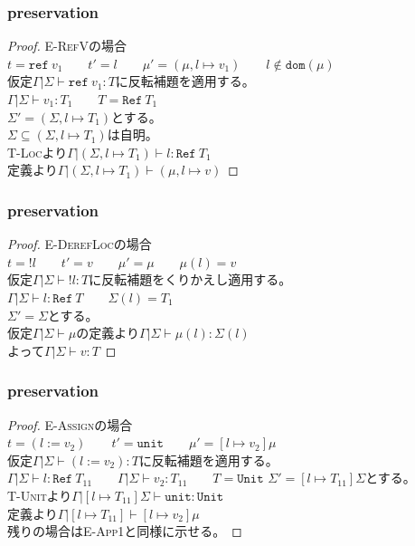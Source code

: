 \documentclass[dvipdfmx,cjk,xcolor=dvipsnames,envcountsect,notheorems]{beamer}
\theoremstyle{definition}
\newcommand{\REF}{\texttt{ref}}
\newcommand{\REFT}{\texttt{Ref}}
\newcommand{\UNIT}{\texttt{unit}}
\newcommand{\UNITT}{\texttt{Unit}}
\begin{document}
\begin{frame}
	\frametitle{preservation}
	\Large
	\begin{proof}
		\textsc{E-RefV}の場合\\
		$t = \REF~v_1 \qquad t' = l \qquad \mu' = (\mu, l \mapsto v_1) \qquad l \notin \texttt{dom}(\mu)$\\
		仮定$\Gamma | \Sigma \vdash \REF~v_1 : T$に反転補題を適用する。\\
		$\Gamma | \Sigma \vdash v_1 : T_1 \qquad T=\REFT~T_1$\\
		$\Sigma' = (\Sigma, l \mapsto T_1)$とする。\\
		$\Sigma \subseteq (\Sigma, l \mapsto T_1)$は自明。\\
		\textsc{T-Loc}より$\Gamma | (\Sigma, l \mapsto T_1) \vdash l : \REFT~T_1$\\
		定義より$\Gamma | (\Sigma, l \mapsto T_1) \vdash (\mu, l \mapsto v)$
	\end{proof}
\end{frame}

\begin{frame}
	\frametitle{preservation}
	\Large
	\begin{proof}
		\textsc{E-DerefLoc}の場合\\
		$t = !l \qquad t' = v \qquad \mu' = \mu \qquad \mu(l)=v$\\
		仮定$\Gamma | \Sigma \vdash !l : T$に反転補題をくりかえし適用する。\\
		$\Gamma | \Sigma \vdash l : \REFT~T \qquad \Sigma(l) = T_1$\\
		$\Sigma'=\Sigma$とする。\\
		仮定$\Gamma | \Sigma \vdash \mu$の定義より$\Gamma | \Sigma \vdash \mu(l) : \Sigma(l)$\\
		よって$\Gamma | \Sigma \vdash v : T$
	\end{proof}
\end{frame}

\begin{frame}
	\frametitle{preservation}
	\Large
	\begin{proof}
		\textsc{E-Assign}の場合\\
		$t = (l:=v_2) \qquad t' = \UNIT \qquad \mu' = [l \mapsto v_2]\mu$\\
		仮定$\Gamma | \Sigma \vdash (l:=v_2) : T$に反転補題を適用する。\\
		$\Gamma | \Sigma \vdash l : \REFT~T_{11} \qquad \Gamma | \Sigma \vdash v_2 : T_{11} \qquad T=\UNITT$
		$\Sigma'=[l \mapsto T_{11}]\Sigma$とする。\\
		\textsc{T-Unit}より$\Gamma | [l \mapsto T_{11}]\Sigma \vdash \UNIT : \UNITT$ \\
		定義より$\Gamma | [l \mapsto T_{11}] \vdash [l \mapsto v_2]\mu$\\
		残りの場合は\textsc{E-App1}と同様に示せる。
	\end{proof}
\end{frame}
\end{document}
